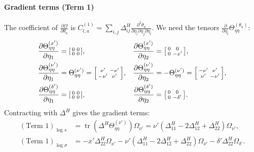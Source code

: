 \documentclass{article}
\begin{document}
\paragraph{Gradient terms (Term 1)}

The coefficient of $\frac{\partial \Omega}{\partial \theta_a}$ is $C^{(1)}_{l,a} = \sum_{i,j} \Delta^H_{ij} \frac{\partial^3 \theta_a}{\partial \eta_i \partial \eta_j \partial \eta_l}$.
We need the tensors $\frac{\partial}{\partial \eta_l} \Theta_{\eta\eta}^{(\theta_a)}$:
%
\begin{align}
  \frac{\partial \Theta_{\eta\eta}^{(x')}}{\partial \eta_1}      & = \begin{bsmallmatrix} 0 & 0 \\ 0 & 0 \end{bsmallmatrix},                              & \frac{\partial \Theta_{\eta\eta}^{(x')}}{\partial \eta_2}      & = \begin{bsmallmatrix} 0 & 0 \\ 0 & -x' \end{bsmallmatrix},                               \\
  \frac{\partial \Theta_{\eta\eta}^{(\nu')}}{\partial \eta_1}    & = \Theta_{\eta\eta}^{(\nu')} = \begin{bsmallmatrix} \nu' & -\nu' \\ -\nu' & \nu' \end{bsmallmatrix}, & \frac{\partial \Theta_{\eta\eta}^{(\nu')}}{\partial \eta_2}    & = -\Theta_{\eta\eta}^{(\nu')} = \begin{bsmallmatrix} -\nu' & \nu' \\ \nu' & -\nu' \end{bsmallmatrix}, \\
  \frac{\partial \Theta_{\eta\eta}^{(\delta')}}{\partial \eta_1} & = \begin{bsmallmatrix} 0 & 0 \\ 0 & 0 \end{bsmallmatrix},                              & \frac{\partial \Theta_{\eta\eta}^{(\delta')}}{\partial \eta_2} & = \begin{bsmallmatrix} 0 & 0 \\ 0 & -\delta' \end{bsmallmatrix}.
\end{align}
%
Contracting with $\Delta^H$ gives the gradient terms:
%
\begin{align}
  (\text{Term 1})_{\log s}      & = \operatorname{tr}(\Delta^H \Theta_{\eta\eta}^{(\nu')}) \Omega_{\nu'} = \nu'(\Delta^H_{11} - 2\Delta^H_{12} + \Delta^H_{22}) \Omega_{\nu'}, \\
  (\text{Term 1})_{\log \sigma} & = -x'\Delta^H_{22}\Omega_{x'} - \nu'(\Delta^H_{11} - 2\Delta^H_{12} + \Delta^H_{22})\Omega_{\nu'} - \delta'\Delta^H_{22}\Omega_{\delta'}.
\end{align}
\end{document}
